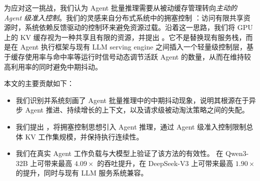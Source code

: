 为应对这一挑战，我们认为 Agent 批量推理需要从被动缓存管理转向\emph{主动的 Agent 级准入控制}。我们的灵感来自分布式系统中的拥塞控制 \cite{congestion_control,chiu1989analysis,tcp}：访问有限共享资源时，系统依赖反馈驱动的控制环来避免资源过载。沿着这一思路，我们将 GPU 上的 KV 缓存视为一种共享且有限的资源，并提出 \SysName{}。它不是替换现有服务栈，而是在 Agent 执行框架与现有 LLM serving engine 之间插入一个轻量级控制层，基于缓存使用率与命中率等运行时信号动态调节活跃 Agent 的数量，从而在维持较高利用率的同时避免中期抖动。

本文的主要贡献如下：
\begin{itemize}[leftmargin=*,nosep]
    \item 我们识别并系统刻画了 Agent 批量推理中的中期抖动现象，说明其根源在于异步 Agent 推进、持续增长的上下文，以及请求级被动淘汰策略之间的失配。
    \item 我们提出 \SysName{}，将拥塞控制思想引入 Agent 推理，通过 Agent 级准入控制限制总体 KV 工作集规模，并保持执行连续性。
    \item 我们在真实 Agent 工作负载与大模型上验证了该方法的有效性。\SysName{} 在 Qwen3-32B 上可带来最高 $4.09\times$ 的吞吐提升，在 DeepSeek-V3 上可带来最高 $1.90\times$ 的提升，同时与现有 LLM 服务系统兼容。
\end{itemize}

